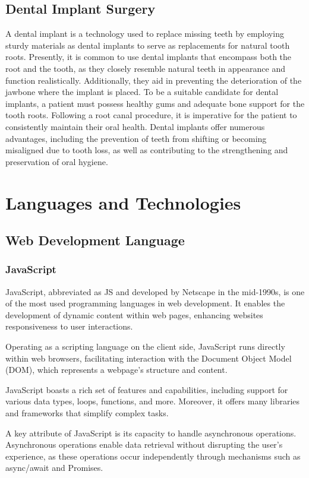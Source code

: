 \documentclass[12pt,oneside,openright,a4paper]{cpe-english-project}
\begin{document}
    \subsection{Dental Implant Surgery}
      \qquad A dental implant is a technology used to replace missing teeth by employing sturdy materials as dental implants to serve as replacements for natural tooth roots. Presently, it is common to use dental implants that encompass both the root and the tooth, as they closely resemble natural teeth in appearance and function realistically. Additionally, they aid in preventing the deterioration of the jawbone where the implant is placed. To be a suitable candidate for dental implants, a patient must possess healthy gums and adequate bone support for the tooth roots. Following a root canal procedure, it is imperative for the patient to consistently maintain their oral health. Dental implants offer numerous advantages, including the prevention of teeth from shifting or becoming misaligned due to tooth loss, as well as contributing to the strengthening and preservation of oral hygiene.\par
  
  \section{Languages and Technologies}
    \subsection{Web Development Language}
      \subsubsection{JavaScript}
        \qquad JavaScript, abbreviated as JS and developed by Netscape in the mid-1990s, is one of the most used programming languages in web development. It enables the development of dynamic content within web pages, enhancing websites responsiveness to user interactions.\par
        \qquad Operating as a scripting language on the client side, JavaScript runs directly within web browsers, facilitating interaction with the Document Object Model (DOM), which represents a webpage's structure and content.\par
        \qquad JavaScript boasts a rich set of features and capabilities, including support for various data types, loops, functions, and more. Moreover, it offers many libraries and frameworks that simplify complex tasks.\par
        \qquad A key attribute of JavaScript is its capacity to handle asynchronous operations. Asynchronous operations enable data retrieval without disrupting the user’s experience, as these operations occur independently through mechanisms such as async/await and Promises.\par
\end{document}
